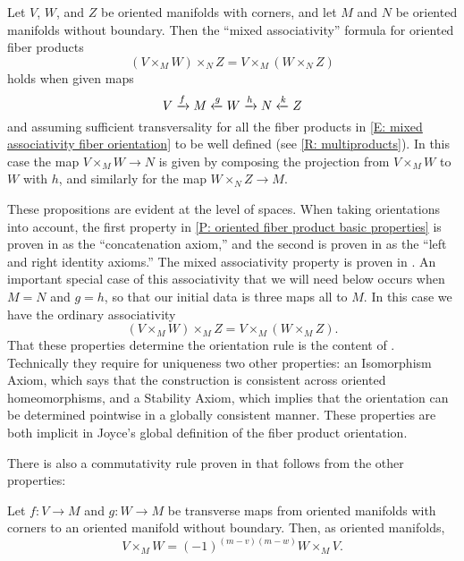 \begin{proposition}\label{P: oriented fiber mixed associativity}
	Let $V$, $W$, and $Z$ be oriented manifolds with corners, and let $M$ and $N$ be oriented manifolds without boundary.
	Then the ``mixed associativity'' formula for oriented fiber products
	\begin{equation}\label{E: mixed associativity fiber orientation}
		(V \times_M W) \times_N Z = V \times_M (W \times_N Z)
	\end{equation}
	holds when given maps
	$$V \xrightarrow{f} M\xleftarrow{g} W \xrightarrow{h} N\xleftarrow{k} Z$$
	and assuming sufficient transversality for all the fiber products in \eqref{E: mixed associativity fiber orientation} to be well defined (see \cref{R: multiproducts}).
	In this case the map $V \times_M W \to N$ is given by composing the projection from $V \times_M W$ to $W$ with $h$, and similarly for the map $W \times_N Z \to M$.
\end{proposition}

These propositions are evident at the level of spaces.
When taking orientations into account, the first property in \cref{P: oriented fiber product basic properties} is proven in \cite[Sections 9.3.9]{RamBas09} as the ``concatenation axiom,'' and the second is proven in \cite[Sections 9.3.5 and 9.3.6]{RamBas09} as the ``left and right identity axioms.''
The mixed associativity property is proven in \cite[Sections 9.3.7]{RamBas09}.
An important special case of this associativity that we will need below occurs when $M = N$ and $g = h$, so that our initial data is three maps all to $M$.
In this case we have the ordinary associativity
\begin{equation}\label{E: oriented fiber associativity}
	(V \times_M W) \times_M Z = V \times_M (W \times_M Z).
\end{equation}
That these properties determine the orientation rule is the content of \cite[Theorem 9-10]{RamBas09}.
Technically they require for uniqueness two other properties: an Isomorphism Axiom, which says that the construction is consistent across oriented homeomorphisms, and a Stability Axiom, which implies that the orientation can be determined pointwise in a globally consistent manner.
These properties are both implicit in Joyce's global definition of the fiber product orientation.

There is also a commutativity rule proven in \cite[Sections 9.3.8]{RamBas09} that follows from the other properties:

\begin{proposition}\label{P: commute oriented fiber}
	Let $f \colon V \to M$ and $g \colon W \to M$ be transverse maps from oriented manifolds with corners to an oriented manifold without boundary.
	Then, as oriented manifolds,
	\begin{equation*}
		V \times_M W = (-1)^{(m-v)(m-w)}W \times_M V.
	\end{equation*}
\end{proposition}

